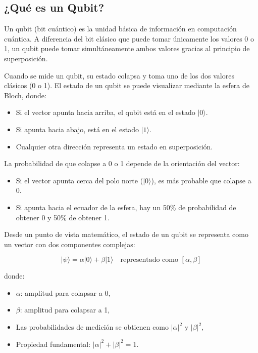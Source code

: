 \documentclass{article}
\begin{document}
\subsection*{¿Qué es un Qubit?}

Un qubit (bit cuántico) es la unidad básica de información en computación cuántica. A diferencia del bit clásico que puede tomar únicamente los valores 0 o 1, un qubit puede tomar simultáneamente ambos valores gracias al principio de superposición.

Cuando se mide un qubit, su estado colapsa y toma uno de los dos valores clásicos (0 o 1). El estado de un qubit se puede visualizar mediante la esfera de Bloch, donde:

\begin{itemize}
    \item Si el vector apunta hacia arriba, el qubit está en el estado $\vert 0 \rangle$.
    \item Si apunta hacia abajo, está en el estado $\vert 1 \rangle$.
    \item Cualquier otra dirección representa un estado en superposición.
\end{itemize}

La probabilidad de que colapse a 0 o 1 depende de la orientación del vector:

\begin{itemize}
    \item Si el vector apunta cerca del polo norte ($\vert 0 \rangle$), es más probable que colapse a 0.
    \item Si apunta hacia el ecuador de la esfera, hay un 50\% de probabilidad de obtener 0 y 50\% de obtener 1.
\end{itemize}

Desde un punto de vista matemático, el estado de un qubit se representa como un vector con dos componentes complejas:

\[
|\psi\rangle = \alpha \vert 0 \rangle + \beta \vert 1 \rangle \quad \text{representado como } [\alpha, \beta]
\]

donde:
\begin{itemize}
    \item $\alpha$: amplitud para colapsar a 0,
    \item $\beta$: amplitud para colapsar a 1,
    \item Las probabilidades de medición se obtienen como $|\alpha|^2$ y $|\beta|^2$,
    \item Propiedad fundamental: $|\alpha|^2 + |\beta|^2 = 1$.
\end{itemize}
\end{document}
